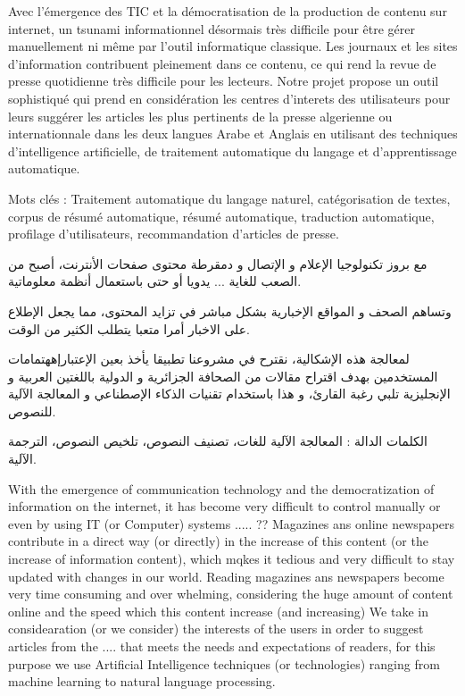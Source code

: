 
\newpage

Avec l'émergence des TIC et la démocratisation de la production de contenu sur internet, un tsunami informationnel désormais très difficile pour être gérer manuellement ni même par l'outil informatique classique. Les journaux et les sites d'information contribuent pleinement dans ce contenu, ce qui rend la revue de presse quotidienne très difficile pour les lecteurs. Notre projet propose un outil sophistiqué qui prend en considération les centres d'interets des utilisateurs pour leurs suggérer les articles les plus pertinents de la presse algerienne ou internationnale dans les deux langues Arabe et Anglais en utilisant des techniques d'intelligence artificielle, de traitement automatique du langage et d'apprentissage automatique. 

Mots clés : Traitement automatique du langage naturel, catégorisation de textes, corpus de résumé
automatique, résumé automatique, traduction automatique, profilage d'utilisateurs,
recommandation d'articles de presse.  


\begin{arab}
مع بروز تكنولوجيا الإعلام و الإتصال و دمقرطة محتوى صفحات الأنترنت، أصبح من الصعب للغاية ... يدويا أو حتى باستعمال أنظمة معلوماتية.

وتساهم الصحف و المواقع الإخبارية بشكل مباشر في تزايد المحتوى، مما يجعل الإطلاع على الاخبار أمرا متعبا يتطلب الكثير من الوقت. 

لمعالجة هذه الإشكالية، نقترح في مشروعنا تطبيقا يأخذ بعين الإعتبارإههتمامات المستخدمين بهدف اقتراح مقالات من الصحافة الجزائرية و الدولية باللغتين العربية و الإنجليزية تلبي رغبة القارئ، و هذا باستخدام تقنيات الذكاء الإصطناعي و المعالجة الآلية للنصوص.

الكلمات الدالة : المعالجة الآلية للغات،  تصنيف النصوص، تلخيص النصوص، الترجمة الآلية. 


With the emergence of communication technology and the democratization of information on the internet, it has become very difficult to control manually or even by using IT (or Computer) systems .....
?? Magazines ans online newspapers contribute in a direct way (or directly) in the increase of this content (or the increase of information content), which mqkes it tedious and very difficult to stay updated with changes in our world.
Reading magazines ans newspapers become very time consuming and over whelming, considering the huge amount of content online and the speed which this content increase (and increasing)
We take in considearation (or we consider) the interests of the users in order to suggest articles from the  ....
that meets the needs and expectations of readers, for this purpose we use Artificial Intelligence techniques (or technologies) ranging from machine learning to natural language processing.

\end{arab}